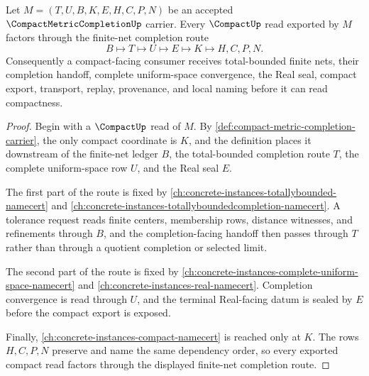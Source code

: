 \begin{theorem}\label{thm:compact-metric-completion-finite-net-seal}
Let $M=(T,U,B,K,E,H,C,P,N)$ be an accepted $\CompactMetricCompletionUp$ carrier. Every $\CompactUp$ read exported by $M$ factors through the finite-net completion route
$$
B \longmapsto T \longmapsto U \longmapsto E \longmapsto K \longmapsto H,C,P,N .
$$
Consequently a compact-facing consumer receives total-bounded finite nets, their completion handoff, complete uniform-space convergence, the Real seal, compact export, transport, replay, provenance, and local naming before it can read compactness.
\end{theorem}
\begin{proof}
Begin with a $\CompactUp$ read of $M$. By \autoref{def:compact-metric-completion-carrier}, the only compact coordinate is $K$, and the definition places it downstream of the finite-net ledger $B$, the total-bounded completion route $T$, the complete uniform-space row $U$, and the Real seal $E$.

The first part of the route is fixed by \autoref{ch:concrete-instances-totallybounded-namecert} and \autoref{ch:concrete-instances-totallyboundedcompletion-namecert}. A tolerance request reads finite centers, membership rows, distance witnesses, and refinements through $B$, and the completion-facing handoff then passes through $T$ rather than through a quotient completion or selected limit.

The second part of the route is fixed by \autoref{ch:concrete-instances-complete-uniform-space-namecert} and \autoref{ch:concrete-instances-real-namecert}. Completion convergence is read through $U$, and the terminal Real-facing datum is sealed by $E$ before the compact export is exposed.

Finally, \autoref{ch:concrete-instances-compact-namecert} is reached only at $K$. The rows $H,C,P,N$ preserve and name the same dependency order, so every exported compact read factors through the displayed finite-net completion route.
\end{proof}


